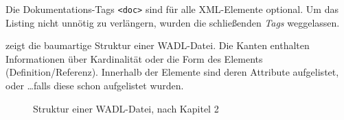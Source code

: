Die Dokumentations-Tags \texttt{<doc>} sind für alle \gls{XML}-Elemente optional.
Um das Listing nicht unnötig zu verlängern, wurden die schließenden \emph{Tags} weggelassen.

 zeigt die baumartige Struktur einer \gls{WADL}-Datei. Die Kanten enthalten Informationen über Kardinalität oder die Form des Elements (Definition/Referenz). Innerhalb der Elemente sind deren Attribute aufgelistet, oder \ldots falls diese schon aufgelistet wurden.

\newpage

\begin{figure}
    \centering
    \resizebox{!}{1.2\textwidth}{
        
    }
    \caption{Struktur einer \gls{WADL}-Datei, nach Kapitel 2 \cite{hadleyWADL}}
    \label{fig:wadlstructure}
\end{figure}